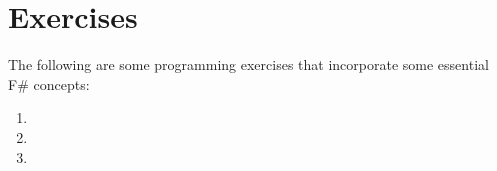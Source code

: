 \section{Exercises}

The following are some programming exercises that incorporate
some essential F# concepts:

\begin{enumerate}



\item

\item

\item

\end{enumerate}
